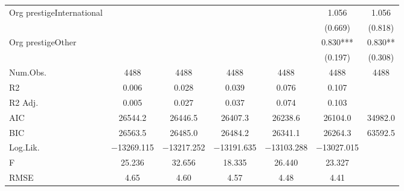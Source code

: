 \begin{table}
\begin{tabular}[t]{lcccccc}
Org prestigeInternational &  &  &  &  & \num{1.056} & \num{1.056}\\
 &  &  &  &  & (\num{0.669}) & (\num{0.818})\\
Org prestigeOther &  &  &  &  & \num{0.830}*** & \num{0.830}**\\
 &  &  &  &  & (\num{0.197}) & (\num{0.308})\\
\midrule
Num.Obs. & \num{4488} & \num{4488} & \num{4488} & \num{4488} & \num{4488} & \num{4488}\\
R2 & \num{0.006} & \num{0.028} & \num{0.039} & \num{0.076} & \num{0.107} & \\
R2 Adj. & \num{0.005} & \num{0.027} & \num{0.037} & \num{0.074} & \num{0.103} & \\
AIC & \num{26544.2} & \num{26446.5} & \num{26407.3} & \num{26238.6} & \num{26104.0} & \num{34982.0}\\
BIC & \num{26563.5} & \num{26485.0} & \num{26484.2} & \num{26341.1} & \num{26264.3} & \num{63592.5}\\
Log.Lik. & \num{-13269.115} & \num{-13217.252} & \num{-13191.635} & \num{-13103.288} & \num{-13027.015} & \\
F & \num{25.236} & \num{32.656} & \num{18.335} & \num{26.440} & \num{23.327} & \\
RMSE & \num{4.65} & \num{4.60} & \num{4.57} & \num{4.48} & \num{4.41} & \\
\bottomrule
\end{tabular}
\end{table}
